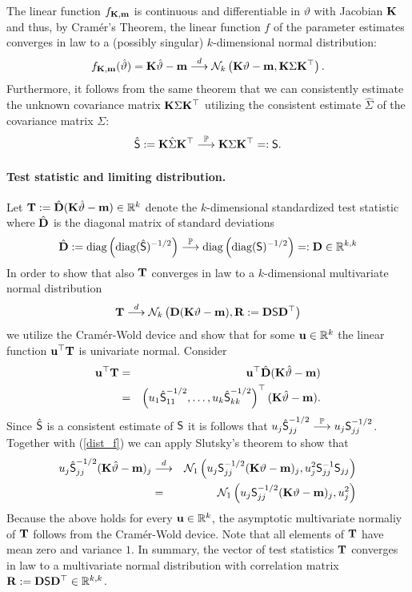 \documentclass[12pt]{article}
\begin{document}
The linear function $f_{\K, \m}$ is continuous and differentiable in
$\vartheta$ with Jacobian $\K$ and thus, by Cram{\'e}r's Theorem, 
the linear function $f$ of the parameter estimates
converges in law to a (possibly singular) $k$-dimensional normal distribution:
\begin{eqnarray} \label{dist_f}
f_{\K, \m}(\hat{\vartheta}) = \K \hat{\vartheta} - \m 
\cL \N_k\left(\K \vartheta - \m, \K \Sigma \K^\top\right).
\end{eqnarray}
Furthermore, it follows from the same theorem that we can 
consistently estimate the unknown covariance matrix $\K \Sigma \K^\top$ utilizing
the consistent estimate $\hat{\Sigma}$ of the covariance matrix $\Sigma$:
\begin{eqnarray*}
\hat{\S} := \K \hat{\Sigma} \K^\top \cP \K \Sigma \K^\top =: \S.
\end{eqnarray*}

\paragraph{Test statistic and limiting distribution.}

Let $\T := \hat{\D} (\K \hat{\vartheta} - \m) \in \R^k$ denote
the $k$-dimensional standardized test statistic where $\hat{\D}$ is the diagonal
matrix of standard deviations
\begin{eqnarray*}
\hat{\D} := \text{diag}\left(\text{diag}(\hat{\S})^{-1/2}\right) \cP 
\text{diag}\left(\text{diag}(\S)^{-1/2}\right) =: \D \in \R^{k,k}
\end{eqnarray*}
In order to show that also $\T$ converges in law to a $k$-dimensional multivariate
normal distribution
\begin{eqnarray*}
\T \cL \N_k\left(\D(\K \vartheta - \m), \Cor := \D \S \D^\top\right)
\end{eqnarray*}
we utilize the Cram{\'e}r-Wold device and show that for some $\uu \in \R^k$ 
the linear function $\uu^\top \T$ is univariate normal. Consider
\begin{eqnarray*}
\uu^\top \T & = & \uu^\top \hat{\D} (\K \hat{\vartheta} - \m) \\
& = & \left(u_1 \hat{\S}_{11}^{-1/2}, \dots, u_k \hat{\S}_{kk}^{-1/2}\right)^\top(\K \hat{\vartheta} - \m).
\end{eqnarray*}
Since $\hat{\S}$ is a consistent estimate of $\S$ it 
is follows that $u_j \hat{\S}_{jj}^{-1/2} \cP u_j \S_{jj}^{-1/2}$.
Together with (\ref{dist_f}) we can apply Slutsky's theorem to show that
\begin{eqnarray*}
u_j \hat{\S}_{jj}^{-1/2} (\K \hat{\vartheta} - \m)_j & \cL &  
\N_1\left(u_j \S_{jj}^{-1/2} (\K \vartheta - \m)_j, u_j^2 \S_{jj}^{-1} \S_{jj}\right) \\
& = & \N_1\left(u_j \S_{jj}^{-1/2} (\K \vartheta - \m)_j, u_j^2\right)
\end{eqnarray*}
Because the above holds for every $\uu \in \R^k$, the asymptotic multivariate
normaliy of $\T$ follows from the Cram{\'e}r-Wold device. Note that
all elements of $\T$ have mean zero and variance $1$. In summary,
the vector of test statistics $\T$ converges in law to a multivariate
normal distribution with correlation matrix 
$\Cor := \D \S \D^\top \in \R^{k,k}$.
\end{document}
